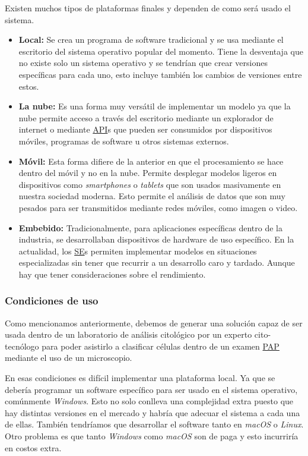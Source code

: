 Existen muchos tipos de plataformas finales y dependen de como será usado
el sistema. 

\begin{itemize}
    \item{\textbf{Local: }} Se crea un programa de software tradicional y se usa
    mediante el escritorio del sistema operativo popular del momento. Tiene la
    desventaja que no existe solo un sistema operativo y se tendrían que crear
    versiones específicas para cada uno, esto incluye también los cambios de
    versiones entre estos.
    \item{\textbf{La nube: }} Es una forma muy versátil de implementar un modelo
    ya que la nube permite acceso a través del escritorio mediante un explorador
    de internet o mediante \hyperlink{abbr}{API}s que pueden ser consumidos por
    dispositivos móviles, programas de software u otros sistemas externos.
    \item{\textbf{Móvil: }} Esta forma difiere de la anterior en que el
    procesamiento se hace dentro del móvil y no en la nube. Permite desplegar
    modelos ligeros en dispositivos como \emph{smartphones} o \emph{tablets} que
    son usados masivamente en nuestra sociedad moderna. Esto permite el análisis
    de datos que son muy pesados para ser transmitidos mediante redes móviles,
    como imagen o video.
    \item{\textbf{Embebido: }} Tradicionalmente, para aplicaciones específicas
    dentro de la industria, se desarrollaban dispositivos de hardware de uso
    específico. En la actualidad, los \hyperlink{abbr}{SE}s permiten implementar
    modelos en situaciones especializadas sin tener que recurrir a un desarrollo
    caro y tardado. Aunque hay que tener consideraciones sobre el rendimiento.
\end{itemize}

\subsubsection{Condiciones de uso}

Como mencionamos anteriormente, debemos de generar una solución capaz de ser
usada dentro de un laboratorio de análisis citológico por un experto
cito-tecnólogo para poder asistirlo a clasificar células dentro de un examen
\hyperlink{abbr}{PAP} mediante el uso de un microscopio.

En esas condiciones es difícil implementar una plataforma local. Ya que se
debería programar un software específico para ser usado en el sistema operativo,
comúnmente \emph{Windows}. Esto no solo conlleva una complejidad extra puesto
que hay distintas versiones en el mercado y habría que adecuar el sistema a cada
una de ellas. También tendríamos que desarrollar el software tanto en
\emph{macOS} o \emph{Linux}. Otro problema es que tanto \emph{Windows} como
\emph{macOS} son de paga y esto incurriría en costos extra.

